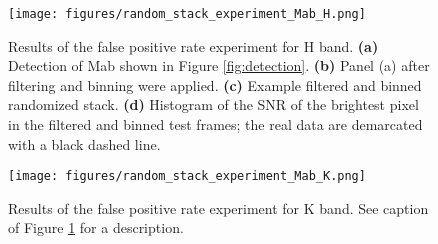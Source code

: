 \documentclass[preprint]{aastex631}
\begin{document}
\begin{figure}
\texttt{[image: figures/random\_stack\_experiment\_Mab\_H.png]}
\caption{Results of the false positive rate experiment for H band. \textbf{(a)} Detection of Mab shown in Figure \ref{fig:detection}. \textbf{(b)} Panel (a) after filtering and binning were applied. \textbf{(c)} Example filtered and binned randomized stack. \textbf{(d)} Histogram of the SNR of the brightest pixel in the filtered and binned test frames; the real data are demarcated with a black dashed line.\label{fig:randomstack}}
\end{figure}

\begin{figure}
\texttt{[image: figures/random\_stack\_experiment\_Mab\_K.png]}
\caption{Results of the false positive rate experiment for K band. See caption of Figure \ref{fig:randomstack} for a description. \label{fig:randomstack_K}}
\end{figure}




\end{document}
